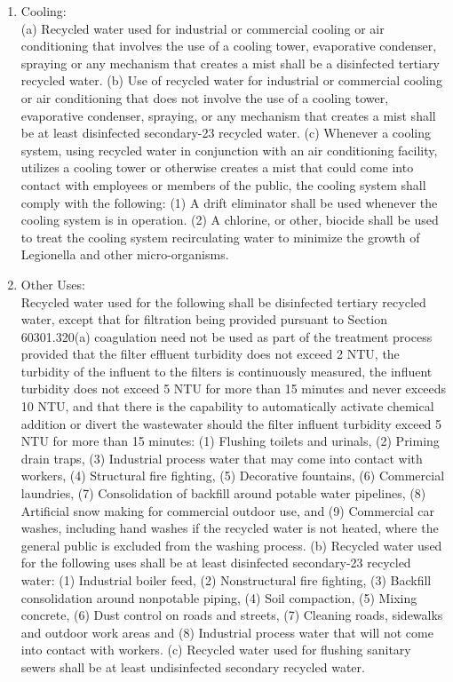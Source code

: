 \begin{enumerate}
\item Cooling:\\
(a) Recycled water used for industrial or commercial cooling or air conditioning that involves the use of a cooling tower, evaporative condenser, spraying or any mechanism that creates a mist shall be a disinfected tertiary recycled water.
(b) Use of recycled water for industrial or commercial cooling or air conditioning that does not involve the use of a cooling tower, evaporative condenser, spraying, or any mechanism that creates a mist shall be at least disinfected secondary-23 recycled water.
(c) Whenever a cooling system, using recycled water in conjunction with an air conditioning facility, utilizes a cooling tower or otherwise creates a mist that could come into contact with employees or members of the public, the cooling system shall comply with the following:
(1) A drift eliminator shall be used whenever the cooling system is in operation.
(2) A chlorine, or other, biocide shall be used to treat the cooling system recirculating water to minimize the growth of Legionella and other micro-organisms.

\item Other Uses:\\
 Recycled water used for the following shall be disinfected tertiary recycled water, except that for filtration being provided pursuant to Section 60301.320(a) coagulation need not be used as part of the treatment process provided that the filter effluent turbidity does not exceed 2 NTU, the turbidity of the influent to the filters is continuously measured, the influent turbidity does not exceed 5 NTU for more than 15 minutes and never exceeds 10 NTU, and that there is the capability to automatically activate chemical addition or divert the wastewater should the filter influent turbidity exceed 5 NTU for more than 15 minutes:
(1) Flushing toilets and urinals,
(2) Priming drain traps,
(3) Industrial process water that may come into contact with workers,
(4) Structural fire fighting,
(5) Decorative fountains,
(6) Commercial laundries,
(7) Consolidation of backfill around potable water pipelines,
(8) Artificial snow making for commercial outdoor use, and
(9) Commercial car washes, including hand washes if the recycled water is not heated, where the general public is excluded from the washing process.
(b) Recycled water used for the following uses shall be at least disinfected secondary-23 recycled water:
(1) Industrial boiler feed,
(2) Nonstructural fire fighting,
(3) Backfill consolidation around nonpotable piping,
(4) Soil compaction,
(5) Mixing concrete,
(6) Dust control on roads and streets,
(7) Cleaning roads, sidewalks and outdoor work areas and
(8) Industrial process water that will not come into contact with workers.
(c) Recycled water used for flushing sanitary sewers shall be at least undisinfected secondary recycled water.
\end{enumerate}


